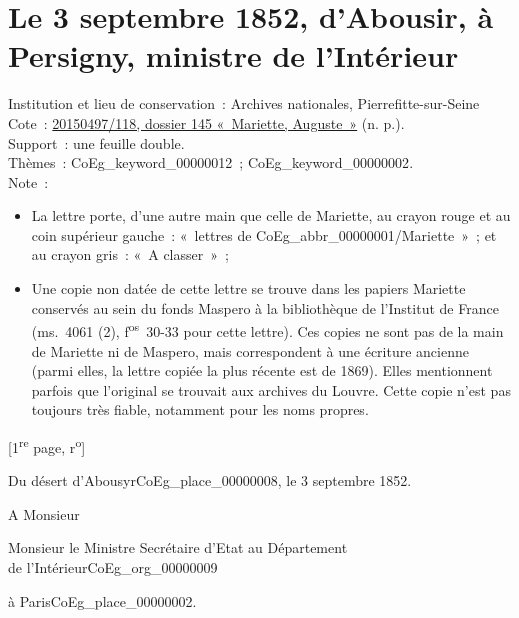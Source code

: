 \documentclass{book}
\begin{document}
\section*{Le 3 septembre 1852, d’Abousir, à Persigny, ministre de l'Intérieur}
{\footnotesize \noindent Institution et lieu de conservation~: Archives nationales, Pierrefitte-sur-Seine\\
Cote~: \hyperlink{CoEg_Mariette_ms_001}{20150497/118, dossier 145 «~Mariette, Auguste~»} (n. p.).\\
Support~: une feuille double.\\
Thèmes~: \gls{CoEg_keyword_00000012}~; \gls{CoEg_keyword_00000002}.\\
Note~: \begin{itemize} \item La lettre porte, d’une autre main que celle de Mariette, au crayon rouge et au coin supérieur gauche~: «~lettres de \gls{CoEg_abbr_00000001}/Mariette~»~; et au crayon gris~: «~A classer~»~;
\item Une copie non datée de cette lettre se trouve dans les papiers Mariette conservés au sein du fonds Maspero à la bibliothèque de l’Institut de France (ms.~4061 (2), f\textsuperscript{os}~30-33 pour cette lettre). Ces copies ne sont pas de la main de Mariette ni de Maspero, mais correspondent à une écriture ancienne (parmi elles, la lettre copiée la plus récente est de 1869). Elles mentionnent parfois que l’original se trouvait aux archives du Louvre. Cette copie n’est pas toujours très fiable, notamment pour les noms propres. \end{itemize}
\begin{center} {[1\textsuperscript{re} page, r\textsuperscript{o}]}\end{center}}

\begin{flushright} Du désert d’Abousyr\gls{CoEg_place_00000008}, le 3 septembre 1852.\end{flushright}
\indent A Monsieur\\
\begin{center}Monsieur le Ministre Secrétaire d’Etat au Département\\
de l’Intérieur\gls{CoEg_org_00000009}\end{center}
\begin{flushright}à Paris\gls{CoEg_place_00000002}.\end{flushright}
\end{document}
